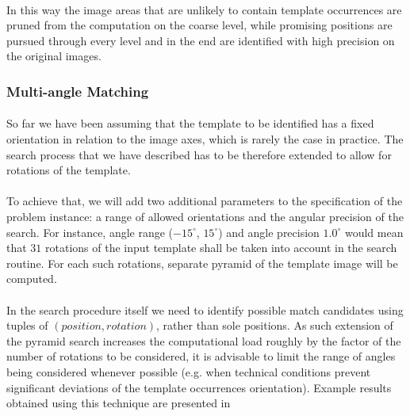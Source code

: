 \paragraph*{}
In this way the image areas that are unlikely to contain template occurrences are pruned from the computation on the coarse level, while promising positions are pursued through every level and in the end are identified with high precision on the original images.

\subsubsection{Multi-angle Matching}

\paragraph*{}
So far we have been assuming that the template to be identified has a fixed orientation in relation to the image axes, which is rarely the case in practice. The search process that we have described has to be therefore extended to allow for rotations of the template.

\paragraph*{}
To achieve that, we will add two additional parameters to the specification of the problem instance: a range of allowed orientations and the angular precision of the search. For instance, angle range ($-15^{\circ}$, $15^{\circ}$) and angle precision $1.0^{\circ}$ would mean that $31$ rotations of the input template shall be taken into account in the search routine. For each such rotations, separate pyramid of the template image will be computed.

\paragraph*{}
In the search procedure itself we need to identify possible match candidates using tuples of $(position, rotation)$, rather than sole positions. As such extension of the pyramid search increases the computational load roughly by the factor of the number of rotations to be considered, it is advisable to limit the range of angles being considered whenever possible (e.g. when technical conditions prevent significant deviations of the template occurrences orientation). Example results obtained using this technique are presented in 

